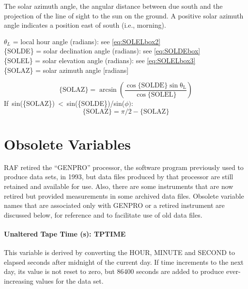 \documentclass[
  english,
]{book}
\begin{document}
The solar azimuth angle, the angular distance between due south and the projection of the line of sight to the sun on the ground. A positive solar azimuth angle indicates a position east of south (i.e., morning).

\(\theta_{L}\) = local hour angle (radians): see \eqref{eq:SOLELbox2}\\
\{SOLDE\} = solar declination angle (radians): see \eqref{eq:SOLDEbox}\\
\{SOLEL\} = solar elevation angle (radians): see \eqref{eq:SOLELbox3}\\
\{SOLAZ\} = solar azimuth angle {[}radians{]}

\begin{equation}
\mathrm{\{SOLAZ\}=\arcsin\left(\frac{\cos\mathrm{\{SOLDE\}\sin\theta_{L}}}{\cos\mathrm{\{SOLEL\}}}\right)}
\label{eq:SOLAZbox1}
\end{equation}
If~sin(\{SOLAZ\})~\textless~sin(\{SOLDE\})/sin(\(\phi):\)\\
\begin{equation}
\mathrm{\{SOLAZ\}} = \pi/2-\mathrm{\{SOLAZ\}}
\label{eq:SOLAZbox2}
\end{equation}

\hypertarget{obsolete-variables}{%
\chapter{Obsolete Variables}\label{obsolete-variables}}

RAF retired the ``GENPRO'' processor, the software program previously used to produce data sets, in 1993, but data files produced by that processor are still retained and available for use. Also, there are some instruments that are now retired but provided measurements in some archived data files. Obsolete variable names that are associated only with GENPRO or a retired instrument are discussed below, for reference and to facilitate use of old data files.

\hypertarget{tptime}{%
\subsubsection*{Unaltered Tape Time (s): TPTIME}\label{tptime}}

This variable is derived by converting the HOUR, MINUTE and SECOND to elapsed seconds after midnight of the current day. If time increments to the next day, its value is not reset to zero, but 86400 seconds are added to produce ever-increasing values for the data set.
\end{document}
